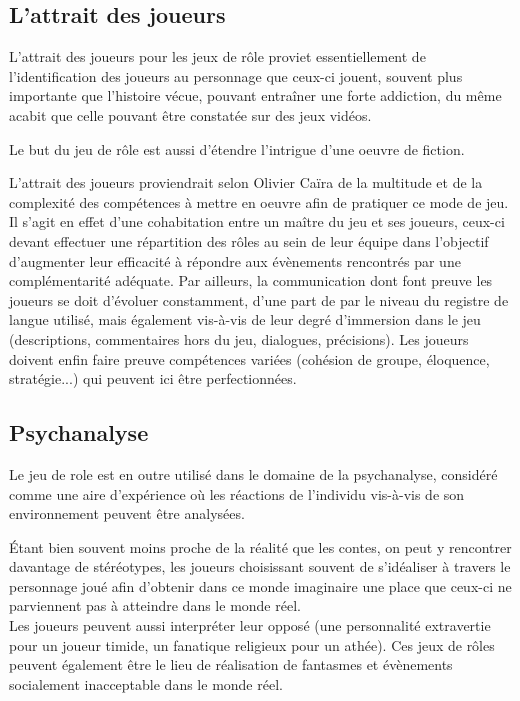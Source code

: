 \documentclass[a4paper,12pt,final,oneside]{article}
\begin{document}
\subsection{L'attrait des joueurs}
L'attrait des joueurs pour les jeux de rôle proviet essentiellement de l'identification des joueurs au personnage que ceux-ci jouent, souvent plus importante que l'histoire vécue, pouvant entraîner une forte addiction, du même acabit que celle pouvant être constatée sur des jeux vidéos.

Le but du jeu de rôle est aussi d'étendre l'intrigue d'une oeuvre de fiction.

L'attrait des joueurs proviendrait selon Olivier Caïra\cite{caira2007jeux} de la multitude et de la complexité des compétences à mettre en oeuvre afin de pratiquer ce mode de jeu. Il s'agit en effet d'une cohabitation entre un maître du jeu et ses joueurs, ceux-ci devant effectuer une répartition des rôles au sein de leur équipe dans l'objectif d'augmenter leur efficacité à répondre aux évènements rencontrés par une complémentarité adéquate. Par ailleurs, la communication dont font preuve les joueurs se doit d'évoluer constamment, d'une part de par le niveau du registre de langue utilisé, mais également vis-à-vis de leur degré d'immersion dans le jeu (descriptions, commentaires hors du jeu, dialogues, précisions). Les joueurs doivent enfin faire preuve compétences variées (cohésion de groupe, éloquence, stratégie...) qui peuvent ici être perfectionnées.

\subsection{Psychanalyse}
Le jeu de role est en outre utilisé dans le domaine de la psychanalyse, considéré comme une aire d'expérience où les réactions de l'individu vis-à-vis de son environnement peuvent être analysées.

Étant bien souvent moins proche de la réalité que les contes, on peut y rencontrer davantage de stéréotypes, les joueurs choisissant souvent de s'idéaliser à travers le personnage joué afin d'obtenir dans ce monde imaginaire une place que ceux-ci ne parviennent pas à atteindre dans le monde réel.\\
Les joueurs peuvent aussi interpréter leur opposé (une personnalité extravertie pour un joueur timide, un fanatique religieux pour un athée). Ces jeux de rôles peuvent également être le lieu de réalisation de fantasmes et évènements socialement inacceptable dans le monde réel.
\end{document}
